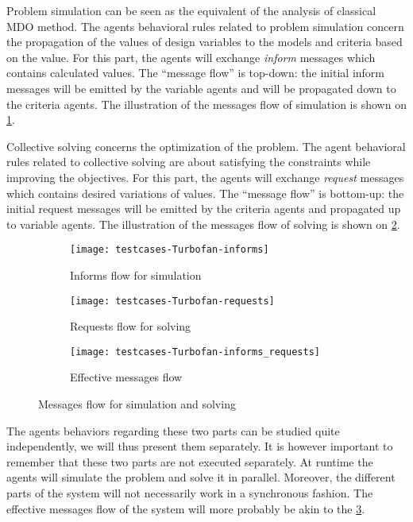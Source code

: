 Problem simulation can be seen as the equivalent of the analysis of classical MDO method. The agents behavioral rules related to problem simulation concern the propagation of the values of design variables to the models and criteria based on the value. For this part, the agents will exchange \emph{inform} messages which contains calculated values. The \enquote{message flow} is top-down: the initial inform messages will be emitted by the variable agents and will be propagated down to the criteria agents. The illustration of the messages flow of simulation is shown on \figurename{} \ref{messages_flow:inf}.

Collective solving concerns the optimization of the problem. The agent behavioral rules related to collective solving are about satisfying the constraints while improving the objectives. For this part, the agents will exchange \emph{request} messages which contains desired variations of values. The \enquote{message flow} is bottom-up: the initial request messages will be emitted by the criteria agents and propagated up to variable agents. The illustration of the messages flow of solving is shown on \figurename{} \ref{messages_flow:req}.

\begin{figure}[h]
	\begin{subfigure}[b]{0.4\textwidth}
		\centering
		\texttt{[image: testcases-Turbofan-informs]}
		\caption{Informs flow for simulation}\label{messages_flow:inf}
	\end{subfigure}
	\hfill
  	\begin{subfigure}[b]{0.4\textwidth}
		\centering
		\texttt{[image: testcases-Turbofan-requests]}
		\caption{Requests flow for solving}\label{messages_flow:req}
	\end{subfigure}

	\centering
	 \begin{subfigure}[b]{0.4\textwidth}
		\texttt{[image: testcases-Turbofan-informs\_requests]}
		\caption{Effective messages flow}\label{messages_flow:eff}
	\end{subfigure}
	
	\caption{Messages flow for simulation and solving}
	\label{messages_flow}

\end{figure}

The agents behaviors regarding these two parts can be studied quite independently, we will thus present them separately.  It is however important to remember that these two parts are not executed separately. At runtime the agents will simulate the problem and solve it in parallel. Moreover, the different parts of the system will not necessarily work in a synchronous fashion. The effective messages flow of the system will more probably be akin to the \figurename{} \ref{messages_flow:eff}.

